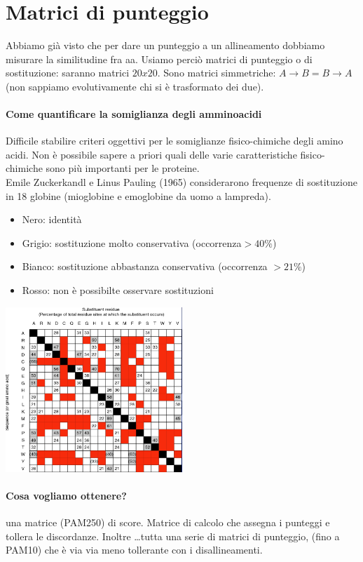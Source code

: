 \documentclass{article}
\begin{document}
\section{Matrici di punteggio}
Abbiamo già visto che per dare un punteggio a un allineamento
dobbiamo misurare la similitudine fra aa.
Usiamo perciò matrici di punteggio o di sostituzione: saranno
matrici $20x20$. Sono matrici simmetriche: $A \rightarrow B = B \rightarrow A$ (non
sappiamo evolutivamente chi si è trasformato dei due).
\paragraph{Come quantificare la somiglianza degli amminoacidi}
Difficile stabilire criteri oggettivi per le somiglianze fisico-chimiche
degli amino acidi. Non è possibile sapere a priori quali delle varie
caratteristiche fisico-chimiche sono più importanti per le proteine.\\
Emile Zuckerkandl e Linus Pauling (1965) considerarono
frequenze di sostituzione in 18 globine (mioglobine e
emoglobine da uomo a lampreda).
\begin{itemize}
    \item Nero: identità
    \item Grigio: sostituzione molto conservativa (occorrenza$>40\%$)
    \item Bianco: sostituzione abbastanza conservativa (occorrenza $> 21 \%$)
    \item Rosso: non è possibilte osservare sostituzioni
\end{itemize}
\begin{center}
    \includegraphics[width=0.5\textwidth]{figures/matx.png}\\
\end{center}
\paragraph{Cosa vogliamo ottenere?} una matrice (PAM250) di score.
Matrice di calcolo che assegna i
punteggi e tollera le discordanze.
Inoltre \dots tutta una serie di matrici di
punteggio, (fino a PAM10) che
è via via meno tollerante con i
disallineamenti.
\end{document}
